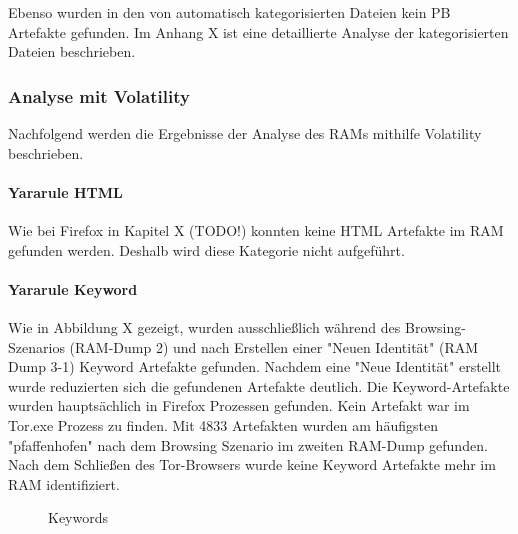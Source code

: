 Ebenso wurden in den von automatisch kategorisierten Dateien kein PB Artefakte gefunden. 
Im Anhang X ist eine detaillierte Analyse der kategorisierten Dateien beschrieben.


\subsubsection*{Analyse mit Volatility}

Nachfolgend werden die Ergebnisse der Analyse des RAMs mithilfe Volatility beschrieben. 

\paragraph*{Yararule HTML}
Wie bei Firefox in Kapitel X (TODO!) konnten keine HTML Artefakte im RAM gefunden werden. Deshalb wird diese Kategorie nicht aufgeführt.

\paragraph*{Yararule Keyword}
Wie in Abbildung X gezeigt, wurden ausschließlich während des Browsing-Szenarios (RAM-Dump 2) und nach Erstellen einer "Neuen Identität" (RAM Dump 3-1) Keyword Artefakte gefunden.
Nachdem eine "Neue Identität" erstellt wurde reduzierten sich die gefundenen Artefakte deutlich. 
Die Keyword-Artefakte wurden hauptsächlich in Firefox Prozessen gefunden. Kein Artefakt war im Tor.exe Prozess zu finden.
Mit 4833 Artefakten wurden am häufigsten "pfaffenhofen" nach dem Browsing Szenario im zweiten RAM-Dump gefunden. 
Nach dem Schließen des Tor-Browsers wurde keine Keyword Artefakte mehr im RAM identifiziert.
\begin{figure}[h!]
	\centerline{}
	\label{chart:final-criteria}  
	\caption{Keywords}
\end{figure}

